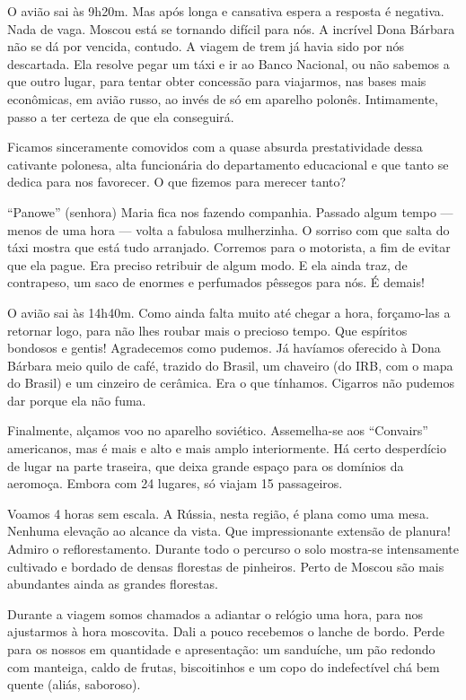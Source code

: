 O avião sai às 9h20m. Mas após longa e cansativa espera a resposta é negativa. Nada de vaga. Moscou está se tornando difícil para nós. A incrível Dona Bárbara não se dá por vencida, contudo. A viagem de trem já havia sido por nós descartada. Ela resolve pegar um táxi e ir ao Banco Nacional, ou não sabemos a que outro lugar, para tentar obter concessão para viajarmos, nas bases mais econômicas, em avião russo, ao invés de só em aparelho polonês. Intimamente, passo a ter certeza de que ela conseguirá.

Ficamos sinceramente comovidos com a quase absurda prestatividade dessa cativante polonesa, alta funcionária do departamento educacional e que tanto se dedica para nos favorecer. O que fizemos para merecer tanto?

``Panowe'' (senhora) Maria fica nos fazendo companhia. Passado algum tempo --- menos de uma hora --- volta a fabulosa mulherzinha. O sorriso com que salta do táxi mostra que está tudo arranjado. Corremos para o motorista, a fim de evitar que ela pague. Era preciso retribuir de algum modo. E ela ainda traz, de contrapeso, um saco de enormes e perfumados pêssegos para nós. É demais!

O avião sai às 14h40m. Como ainda falta muito até chegar a hora, forçamo-las a retornar logo, para não lhes roubar mais o precioso tempo. Que espíritos bondosos e gentis! Agradecemos como pudemos. Já havíamos oferecido à Dona Bárbara meio quilo de café, trazido do Brasil, um chaveiro (do IRB, com o mapa do Brasil) e um cinzeiro de cerâmica. Era o que tínhamos. Cigarros não pudemos dar porque ela não fuma.

Finalmente, alçamos voo no aparelho soviético. Assemelha-se aos ``Convairs'' americanos, mas é mais e alto e mais amplo interiormente. Há certo desperdício de lugar na parte traseira, que deixa grande espaço para os domínios da aeromoça. Embora com 24 lugares, só viajam 15 passageiros.

Voamos 4 horas sem escala. A Rússia, nesta região, é plana como uma mesa. Nenhuma elevação ao alcance da vista. Que impressionante extensão de planura! Admiro o reflorestamento. Durante todo o percurso o solo mostra-se intensamente cultivado e bordado de densas florestas de pinheiros. Perto de Moscou são mais abundantes ainda as grandes florestas.

Durante a viagem somos chamados a adiantar o relógio uma hora, para nos ajustarmos à hora moscovita. Dali a pouco recebemos o lanche de bordo. Perde para os nossos em quantidade e apresentação: um sanduíche, um pão redondo com manteiga, caldo de frutas, biscoitinhos e um copo do indefectível chá bem quente (aliás, saboroso).

